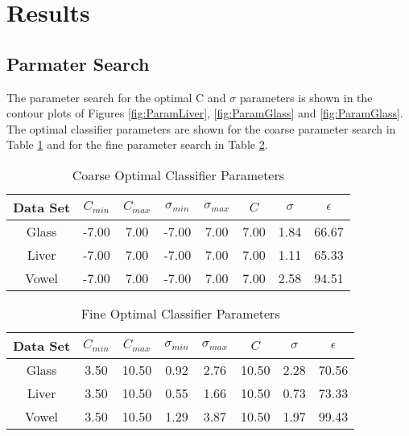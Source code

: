 \section{Results}
\label{sec:Results}

\subsection{Parmater Search}

The parameter search for the optimal C and $\sigma$ parameters is shown in the contour plots of Figures \ref{fig:ParamLiver}, \ref{fig:ParamGlass} and \ref{fig:ParamGlass}.
The optimal classifier parameters are shown for the coarse parameter search in Table \ref{tab:CoarseParamValues} and for the fine parameter search in Table \ref{tab:FineParamValues}.
\begin{table}[h!]
\caption{Coarse Optimal Classifier Parameters}
\label{tab:CoarseParamValues}
\begin{tabular}{c c c c c c c c}
\hline
Data Set & $C_{min}$ & $C_{max}$ & $\sigma_{min}$ & $\sigma_{max}$ & $C$ & $\sigma$ & $\epsilon$ \\ 
\hline
Glass & -7.00 & 7.00 & -7.00 & 7.00 & 7.00 & 1.84 & 66.67 \\ 
Liver & -7.00 & 7.00 & -7.00 & 7.00 & 7.00 & 1.11 & 65.33 \\ 
Vowel & -7.00 & 7.00 & -7.00 & 7.00 & 7.00 & 2.58 & 94.51 \\ 
\hline
\end{tabular}
\end{table}
\begin{table}[ht]
\caption{Fine Optimal Classifier Parameters}
\label{tab:FineParamValues}
\begin{tabular}{c c c c c c c c}
Data Set & $C_{min}$ & $C_{max}$ & $\sigma_{min}$ & $\sigma_{max}$ & $C$ & $\sigma$ & $\epsilon$ \\ 
\hline
Glass & 3.50 & 10.50 & 0.92 & 2.76 & 10.50 & 2.28 & 70.56 \\ 
Liver & 3.50 & 10.50 & 0.55 & 1.66 & 10.50 & 0.73 & 73.33 \\ 
Vowel & 3.50 & 10.50 & 1.29 & 3.87 & 10.50 & 1.97 & 99.43 \\ 
\hline
\end{tabular}
\end{table}
